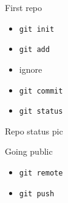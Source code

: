 \documentclass{beamer}
\begin{document}
\begin{frame}{First repo}
  \begin{itemize}
    \item \texttt{git init}
    \item \texttt{git add}
    \item ignore
    \item \texttt{git commit}
    \item \texttt{git status}
  \end{itemize}
\end{frame}
\begin{frame}{Repo status}
pic
\end{frame}

\begin{frame}{Going public}
  \begin{itemize}
    \item \texttt{git remote}
    \item \texttt{git push}
  \end{itemize}
\end{frame}
\end{document}
